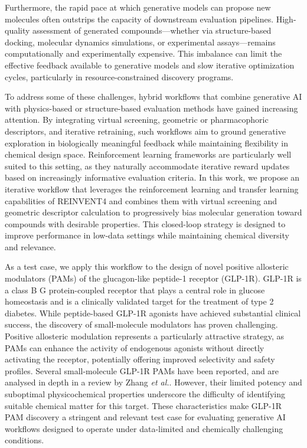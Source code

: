 Furthermore, the rapid pace at which generative models can propose new molecules often outstrips the capacity of downstream evaluation pipelines. High-quality assessment of generated compounds—whether via structure-based docking, molecular dynamics simulations, or experimental assays—remains computationally and experimentally expensive. This imbalance can limit the effective feedback available to generative models and slow iterative optimization cycles, particularly in resource-constrained discovery programs.

To address some of these challenges, hybrid workflows that combine generative AI with physics-based or structure-based evaluation methods have gained increasing attention. By integrating virtual screening, geometric or pharmacophoric descriptors, and iterative retraining, such workflows aim to ground generative exploration in biologically meaningful feedback while maintaining flexibility in chemical design space. Reinforcement learning frameworks are particularly well suited to this setting, as they naturally accommodate iterative reward updates based on increasingly informative evaluation criteria. In this work, we propose an iterative workflow that leverages the reinforcement learning and transfer learning capabilities of REINVENT4 and combines them with virtual screening and geometric descriptor calculation to progressively bias molecular generation toward compounds with desirable properties. This closed-loop strategy is designed to improve performance in low-data settings while maintaining chemical diversity and relevance.

As a test case, we apply this workflow to the design of novel positive allosteric modulators (PAMs) of the glucagon-like peptide-1 receptor (GLP-1R). GLP-1R is a class B G protein-coupled receptor that plays a central role in glucose homeostasis and is a clinically validated target for the treatment of type 2 diabetes\cite{Perfetti2000Glucagon-likeFunction}. While peptide-based GLP-1R agonists have achieved substantial clinical success, the discovery of small-molecule modulators has proven challenging. Positive allosteric modulation represents a particularly attractive strategy, as PAMs can enhance the activity of endogenous agonists without directly activating the receptor, potentially offering improved selectivity and safety profiles. Several small-molecule GLP-1R PAMs have been reported, and are analysed in depth in a review by Zhang \textit{et al.}\cite{Zhang2024BindingAgonists}. However, their limited potency and suboptimal physicochemical properties underscore the difficulty of identifying suitable chemical matter for this target\cite{Wang2021AllostericSite}. These characteristics make GLP-1R PAM discovery a stringent and relevant test case for evaluating generative AI workflows designed to operate under data-limited and chemically challenging conditions.

